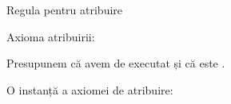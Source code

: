 \begin{frame}{Regula pentru atribuire}

\vspace{-.6cm}
\alert{Axioma atribuirii:} 

\medskip
\begin{example}
Presupunem că avem de executat  și că  este .

O instanță a axiomei de atribuire:
\pause
\vspace{-.2cm}
\begin{center}
\end{center}
\end{example}
\end{frame}

%
%


